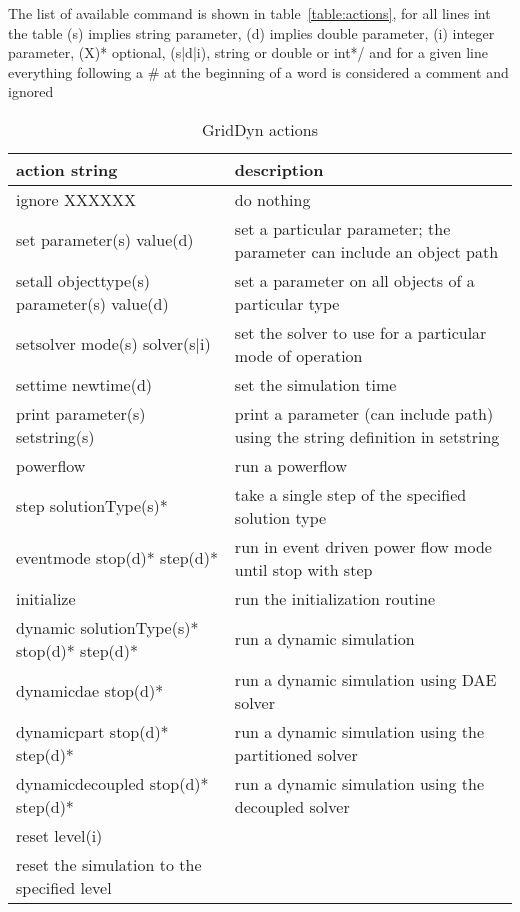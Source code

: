 \documentclass[12pt]{article} %
\begin{document}
The list of available command is shown in table~\ref{table:actions}, for all lines int the table
(s) implies string parameter,  (d) implies double parameter,  (i) integer parameter, (X)* optional, (s|d|i), string or double or int*/
and for a given line everything following a \# at the beginning of a word is considered a comment and ignored
\begin{table}[ht]

    \caption{GridDyn actions} %
    \centering %
    \begin{tabular}{l p{7cm}} %
        \hline %
        action string & description \\ [0.5ex] %
        \hline %
    ignore XXXXXX & do nothing \\
    set parameter(s) value(d) & set a particular parameter;  the parameter can include an object path \\
    setall  objecttype(s) parameter(s) value(d) & set a parameter on all objects of a particular type \\
    setsolver mode(s) solver(s|i) & set the solver to use for a particular mode of operation \\
    settime newtime(d) &  set the simulation time \\
    print parameter(s) setstring(s) &  print a parameter (can include path) using the string definition in setstring \\
    powerflow & run a powerflow \\
    step solutionType(s)* & take a single step of the specified solution type \\
    eventmode stop(d)*  step(d)* & run in event driven power flow mode until stop with step \\
    initialize &     run the initialization routine \\
    dynamic solutionType(s)* stop(d)* step(d)* &  run a dynamic simulation \\
    dynamicdae stop(d)*  &  run a dynamic simulation using DAE solver \\
    dynamicpart stop(d)* step(d)* & run a dynamic simulation using the partitioned solver \\
    dynamicdecoupled stop(d)* step(d)* & run a dynamic simulation using the decoupled solver \\
    reset level(i) & \\  reset the simulation to the specified level \\

\end{tabular}
\end{table}
\end{document}
